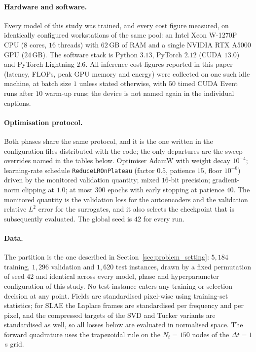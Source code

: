 ﻿\documentclass[a4paper,12pt]{article}
\theoremstyle{definition}
\theoremstyle{remark}
\begin{document}
\paragraph{Hardware and software.}
Every model of this study was trained, and every cost figure measured, on identically configured workstations of the same pool: an Intel Xeon W-1270P CPU ($8$ cores, $16$ threads) with $62$\,GB of RAM and a single NVIDIA RTX A5000 GPU ($24$\,GB). The software stack is Python $3.13$, PyTorch $2.12$ (CUDA $13.0$) and PyTorch Lightning $2.6$. All inference-cost figures reported in this paper (latency, FLOPs, peak GPU memory and energy) were collected on one such idle machine, at batch size $1$ unless stated otherwise, with $50$ timed CUDA Event runs after $10$ warm-up runs; the device is not named again in the individual captions.

\paragraph{Optimisation protocol.}
Both phases share the same protocol, and it is the one written in the configuration files distributed with the code; the only departures are the sweep overrides named in the tables below. Optimiser AdamW with weight decay $10^{-4}$; learning-rate schedule \texttt{ReduceLROnPlateau} (factor $0.5$, patience $15$, floor $10^{-6}$) driven by the monitored validation quantity; mixed $16$-bit precision; gradient-norm clipping at $1.0$; at most $300$ epochs with early stopping at patience $40$. The monitored quantity is the validation loss for the autoencoders and the validation relative $L^2$ error for the surrogates, and it also selects the checkpoint that is subsequently evaluated. The global seed is $42$ for every run.

\paragraph{Data.}
The partition is the one described in Section~\ref{sec:problem_setting}: $5{,}184$ training, $1{,}296$ validation and $1{,}620$ test instances, drawn by a fixed permutation of seed $42$ and identical across every model, phase and hyperparameter configuration of this study. No test instance enters any training or selection decision at any point. Fields are standardised pixel-wise using training-set statistics; for SLAE the Laplace frames are standardised per frequency and per pixel, and the compressed targets of the SVD and Tucker variants are standardised as well, so all losses below are evaluated in normalised space. The forward quadrature uses the trapezoidal rule on the $N_t = 150$ nodes of the $\Delta t = 1$\,s grid.
\end{document}
